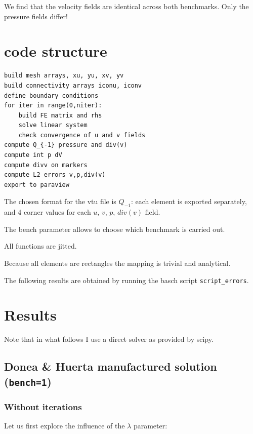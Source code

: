 We find that the velocity fields are identical across 
both benchmarks. Only the pressure fields differ!

\section*{code structure}

\begin{verbatim}
build mesh arrays, xu, yu, xv, yv
build connectivity arrays iconu, iconv
define boundary conditions
for iter in range(0,niter):
    build FE matrix and rhs
    solve linear system
    check convergence of u and v fields
compute Q_{-1} pressure and div(v)
compute int p dV
compute divv on markers
compute L2 errors v,p,div(v)
export to paraview
\end{verbatim}
The chosen format for the vtu file is $Q_{-1}$: each element
is exported separately, and 4 corner values for 
each $u$, $v$, $p$, $div(v)$ field.

The {\python bench} parameter allows to choose 
which benchmark is carried out.

All functions are jitted.

Because all elements are rectangles the mapping is trivial
and analytical. 

The following results are obtained by running the basch script
{\tt script\_errors}.

\newpage
\section*{Results}

Note that in what follows I use a direct solver as provided by scipy.

\subsection*{Donea \& Huerta manufactured solution ({\tt bench=1})}

\subsubsection*{Without iterations}

Let us first explore the influence of the $\lambda$ parameter:

